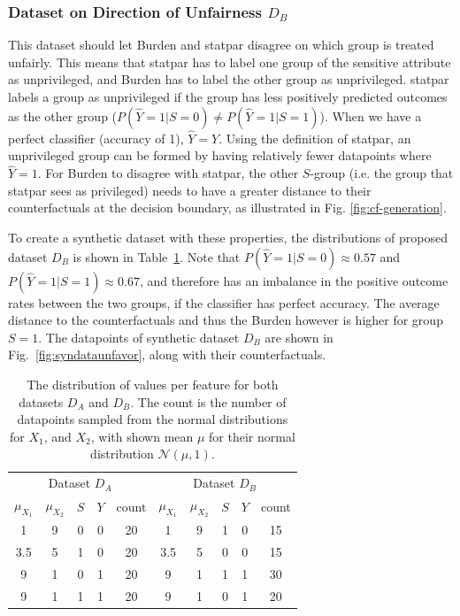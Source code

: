 \documentclass[runningheads]{llncs}
\begin{document}
\subsubsection{Dataset on Direction of Unfairness $D_B$}

This dataset should let \gls{Burden} and \gls{statpar} disagree on which group
is treated unfairly. This means that \gls{statpar} has to label one group of
the sensitive attribute as unprivileged, and \gls{Burden} has to label the
other group as unprivileged. \Gls{statpar} labels a group as unprivileged if
the group has less positively predicted outcomes as the other group
($P(\hat{Y}=1|S=0) \neq P(\hat{Y}=1|S=1)$). When we have a perfect classifier
(accuracy of 1), $\hat{Y} = Y$. Using the definition of \gls{statpar}, an
unprivileged group can be formed by having relatively fewer datapoints where
$\hat{Y}=1$. For \gls{Burden} to disagree with \gls{statpar}, the other
$S$-group (i.e. the group that \gls{statpar} sees as privileged) needs to have
a greater distance to their counterfactuals at the decision boundary, as
illustrated in Fig. \ref{fig:cf-generation}.

To create a synthetic dataset with these properties, the distributions of
proposed dataset $D_B$ is shown in Table~\ref{tab:syndata}. Note that
$P(\hat{Y}=1|S=0)\approx0.57$ and $P(\hat{Y}=1|S=1)\approx0.67$, and therefore
has an imbalance in the positive outcome rates between the two groups, if the
classifier has perfect accuracy. The average distance to the counterfactuals
and thus the \gls{Burden} however is higher for group $S=1$. The datapoints of
synthetic dataset $D_B$ are shown in Fig.~\ref{fig:syndataunfavor}, along with
their counterfactuals.

\begin{table}
    \centering
    \caption{The distribution of values per feature for both datasets $D_A$ and
    $D_B$. The count is the number of datapoints sampled from the normal
    distributions for $X_1$, and $X_2$, with shown mean $\mu$ for their normal
    distribution $\mathcal{N}(\mu, 1)$.}
    \label{tab:syndata}
    \begin{tabularx}{.7\textwidth}{@{\extracolsep{\fill}}cccccccccc}
        \toprule
        \multicolumn{5}{c}{Dataset $D_A$} & \multicolumn{5}{c}{Dataset $D_B$}\\
        \cmidrule(lr){1-5}\cmidrule(lr){6-10}
        $\mu_{X_1}$ & $\mu_{X_2}$ & $S$ & $Y$ & count & $\mu_{X_1}$ & $\mu_{X_2}$ & $S$ & $Y$ & count\\
        \midrule
        1 & 9 & 0 & 0 & 20 & \hspace{0.2cm} 1 & 9 & 1 & 0 & 15\\
        3.5 & 5 & 1 & 0 & 20 &\hspace{0.2cm} 3.5 & 5 & 0 & 0 & 15\\
        9 & 1 & 0 & 1 & 20 &\hspace{0.2cm}  9 & 1 & 1 & 1 & 30\\
        9 & 1 & 1 & 1 & 20 & \hspace{0.2cm} 9 & 1 & 0 & 1 & 20\\
        \bottomrule
    \end{tabularx}
\end{table}
\end{document}
